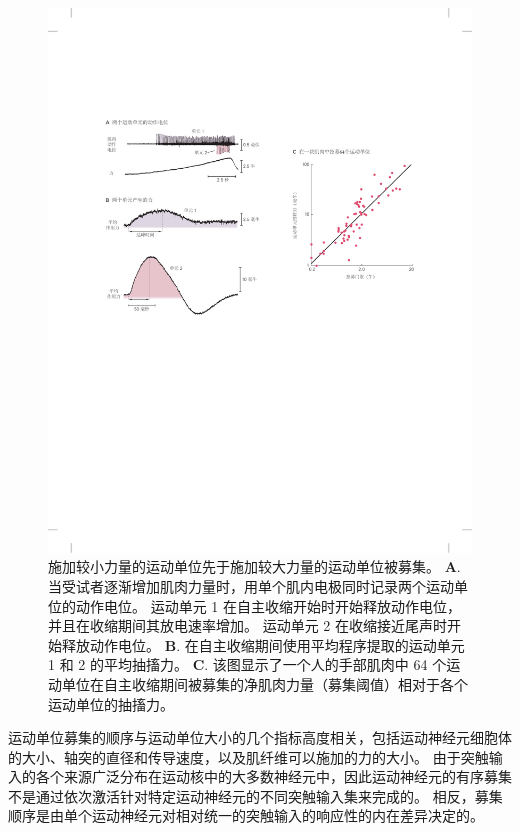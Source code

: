\begin{figure}[htbp]
	\centering
	\includegraphics[width=1.0\linewidth]{chap31/fig_31_5}
	\caption{施加较小力量的运动单位先于施加较大力量的运动单位被募集\cite{desmedt1977ballistic,milner1973orderly}。
	\textbf{A}.当受试者逐渐增加肌肉力量时，用单个肌内电极同时记录两个运动单位的动作电位。
	运动单元 1 在自主收缩开始时开始释放动作电位，并且在收缩期间其放电速率增加。
	运动单元 2 在收缩接近尾声时开始释放动作电位。
	\textbf{B}. 在自主收缩期间使用平均程序提取的运动单元 1 和 2 的平均抽搐力。
	\textbf{C}. 该图显示了一个人的手部肌肉中 64 个运动单位在自主收缩期间被募集的净肌肉力量（募集阈值）相对于各个运动单位的抽搐力。}
	\label{fig:31_5}
\end{figure}


运动单位募集的顺序与运动单位大小的几个指标高度相关，包括运动神经元细胞体的大小、轴突的直径和传导速度，以及肌纤维可以施加的力的大小。
由于突触输入的各个来源广泛分布在运动核中的大多数神经元中，因此运动神经元的有序募集不是通过依次激活针对特定运动神经元的不同突触输入集来完成的。
相反，募集顺序是由单个运动神经元对相对统一的突触输入的响应性的内在差异决定的。


